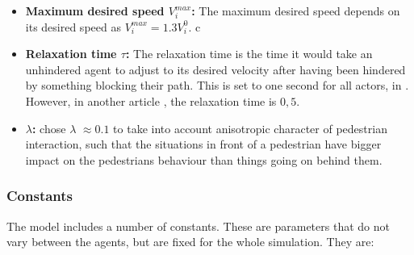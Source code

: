 \begin{itemize}
    \item \textbf{Maximum desired speed $ V_{i}^{max} $:} The maximum 
        desired speed depends on its desired speed as $ V_{i}^{max} =1.3 V_{i}^{0}  $.
       c
        
    \item \textbf{Relaxation time $ \tau $:} The relaxation time is the time it would 
        take an unhindered agent to adjust to its desired velocity after 
        having been hindered by something blocking their path. This is set to 
        one second for all actors, in \cite{self-org}. However, in another article 
        \cite{helbing00}, the relaxation time is $ 0,5 $.

    \item \textbf{$\lambda$:} \cite{ABconstant} chose $\lambda$ $\approx 0.1$ 
        to take into account
    anisotropic character of pedestrian interaction, such that the situations 
    in front of
    a pedestrian have bigger impact on the pedestrians behaviour than things 
    going on
    behind them. 
\end{itemize}

\subsubsection{Constants} \label{constants}
The model includes a number of constants. These are parameters that do not 
vary between the agents, but are fixed for the whole simulation. They are:

